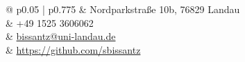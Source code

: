 \documentclass[10pt]{FreemanCV}
\begin{document}
\begin{paracol}{2}
	
	

\medskip %


\switchcolumn %


\parbox[top][0.11\textheight][c]{\linewidth}{ %
	\colorbox{shade}{ %
		\begin{supertabular}{@{\hspace{3pt}} p{0.05\linewidth} | p{0.775\linewidth}}
			\raisebox{-1pt}{\faHome} & Nordparkstraße 10b, 76829 Landau \\ %
			\raisebox{-1pt}{\faPhone} & +49 1525 3606062\\ %
			\raisebox{-1pt}{\small\faEnvelope} & \href{mailto:bissantz@uni-landau.de}{bissantz@uni-landau.de} \\ %
			\raisebox{-1pt}{\small\faGithub} & \href{https://github.com/sbissantz}{https://github.com/sbissantz} \\ %
		\end{supertabular}
	}
	\vfill %
}


\end{paracol}
\end{document}
